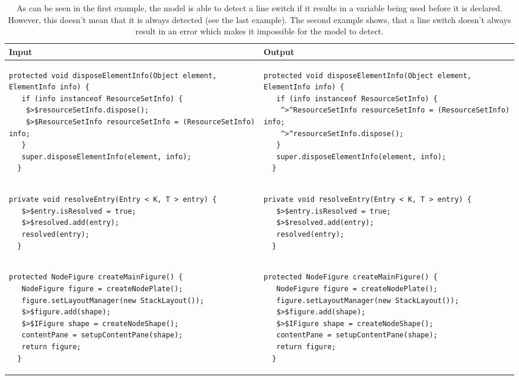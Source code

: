 \begin{landscape}
\begin{table}[p]
\begin{tabular}{ | m{10cm} | m{10cm} | }
  \hline
  Input & Output \\
  \hline
  {\begin{lstlisting}[style=table]
  protected void disposeElementInfo(Object element, ElementInfo info) {
   if (info instanceof ResourceSetInfo) {
    $>$resourceSetInfo.dispose();
    $>$ResourceSetInfo resourceSetInfo = (ResourceSetInfo) info;
   }
   super.disposeElementInfo(element, info);
  }
  \end{lstlisting}} &
  {\begin{lstlisting}[style=table]
  protected void disposeElementInfo(Object element, ElementInfo info) {
   if (info instanceof ResourceSetInfo) {
    ^>^ResourceSetInfo resourceSetInfo = (ResourceSetInfo) info;
    ^>^resourceSetInfo.dispose();
   }
   super.disposeElementInfo(element, info);
  }
  \end{lstlisting}} \\
  \hline
  {\begin{lstlisting}[style=table]
  private void resolveEntry(Entry < K, T > entry) {
   $>$entry.isResolved = true;
   $>$resolved.add(entry);
   resolved(entry);
  }
  \end{lstlisting}} &
  {\begin{lstlisting}[style=table]
  private void resolveEntry(Entry < K, T > entry) {
   $>$entry.isResolved = true;
   $>$resolved.add(entry);
   resolved(entry);
  }
  \end{lstlisting}} \\
  \hline
  {\begin{lstlisting}[style=table]
  protected NodeFigure createMainFigure() {
   NodeFigure figure = createNodePlate();
   figure.setLayoutManager(new StackLayout());
   $>$figure.add(shape);
   $>$IFigure shape = createNodeShape();
   contentPane = setupContentPane(shape);
   return figure;
  }
  \end{lstlisting}} &
  {\begin{lstlisting}[style=table]
  protected NodeFigure createMainFigure() {
   NodeFigure figure = createNodePlate();
   figure.setLayoutManager(new StackLayout());
   $>$figure.add(shape);
   $>$IFigure shape = createNodeShape();
   contentPane = setupContentPane(shape);
   return figure;
  }
  \end{lstlisting}} \\
  \hline
\end{tabular}
\caption{As can be seen in the first example, the model is able to detect a line switch if it results in a variable being used before it is declared. However, this doesn't mean that it is always detected (see the last example). The second example shows, that a line switch doesn't always result in an error which makes it impossible for the model to detect.}
\label{switch_showcase_table}
\end{table}
\end{landscape}
\clearpage
